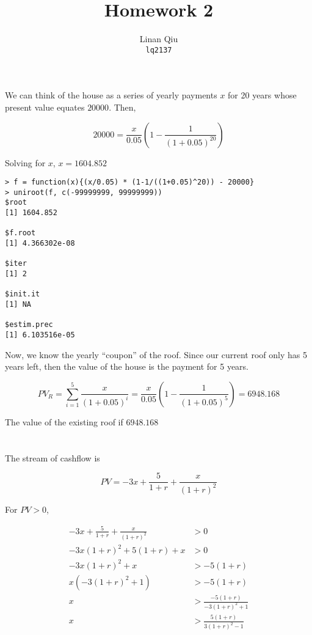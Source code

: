 \documentclass[11pt]{scrartcl}
\title{Homework 2}
\author{Linan Qiu\\\texttt{lq2137}}
\begin{document}
\maketitle

\section{}

We can think of the house as a series of yearly payments $x$ for 20 years whose present value equates $20000$. Then,

\[20000 = \frac{x}{0.05}\left(1 - \frac{1}{(1+0.05)^{20}}\right)\]

Solving for $x$, $x = 1604.852$

\begin{lstlisting}
> f = function(x){(x/0.05) * (1-1/((1+0.05)^20)) - 20000}
> uniroot(f, c(-99999999, 99999999))
$root
[1] 1604.852

$f.root
[1] 4.366302e-08

$iter
[1] 2

$init.it
[1] NA

$estim.prec
[1] 6.103516e-05
\end{lstlisting}

Now, we know the yearly ``coupon'' of the roof. Since our current roof only has 5 years left, then the value of the house is the payment for 5 years.

\[PV_R = \sum_{i=1}^5 \frac{x}{(1+0.05)^i} = \frac{x}{0.05}\left(1 - \frac{1}{(1+0.05)^5} \right) = 6948.168\]

The value of the existing roof if $6948.168$

\section{}

\subsection{}

The stream of cashflow is

\[PV = -3x + \frac{5}{1+r} + \frac{x}{(1+r)^2}\]

For $PV > 0$, 

\begin{align*}
-3x + \frac{5}{1+r} + \frac{x}{(1+r)^2} &> 0 \\
-3x(1+r)^2 + 5(1+r) + x &> 0 \\
-3x(1+r)^2 + x &> -5(1+r) \\
x(-3(1+r)^2 + 1) &> -5(1+r) \\
x &> \frac{-5(1+r)}{-3(1+r)^2 + 1} \\
x &> \frac{5(1+r)}{3(1+r)^2 - 1}
\end{align*}
\end{document}
